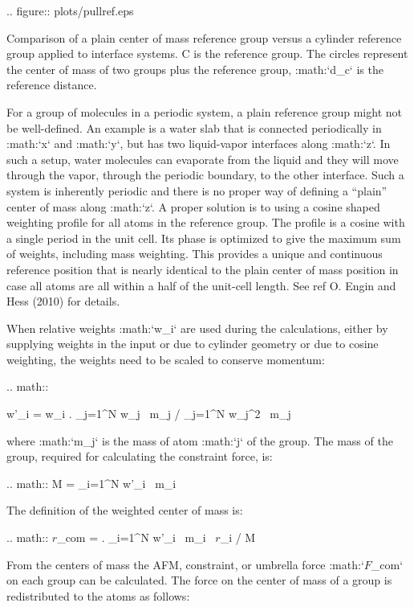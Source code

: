 .. figure:: plots/pullref.eps

   Comparison of a plain center of mass reference group versus a
   cylinder reference group applied to interface systems. C is the
   reference group. The circles represent the center of mass of two
   groups plus the reference group, :math:`d_c` is the reference
   distance.

For a group of molecules in a periodic system, a plain reference group
might not be well-defined. An example is a water slab that is connected
periodically in :math:`x` and :math:`y`, but has two liquid-vapor
interfaces along :math:`z`. In such a setup, water molecules can
evaporate from the liquid and they will move through the vapor, through
the periodic boundary, to the other interface. Such a system is
inherently periodic and there is no proper way of defining a “plain”
center of mass along :math:`z`. A proper solution is to using a cosine
shaped weighting profile for all atoms in the reference group. The
profile is a cosine with a single period in the unit cell. Its phase is
optimized to give the maximum sum of weights, including mass weighting.
This provides a unique and continuous reference position that is nearly
identical to the plain center of mass position in case all atoms are all
within a half of the unit-cell length. See ref O. Engin and Hess (2010)
for details.

When relative weights :math:`w_i` are used during the calculations,
either by supplying weights in the input or due to cylinder geometry or
due to cosine weighting, the weights need to be scaled to conserve
momentum:

.. math::

   w'_i = w_i
   \left. \sum_{j=1}^N w_j \, m_j \right/ \sum_{j=1}^N w_j^2 \, m_j

where :math:`m_j` is the mass of atom :math:`j` of the group. The mass
of the group, required for calculating the constraint force, is:

.. math:: M = \sum_{i=1}^N w'_i \, m_i

The definition of the weighted center of mass is:

.. math:: {\mbox{\boldmath ${r}$}}_{com} = \left. \sum_{i=1}^N w'_i \, m_i \, {\mbox{\boldmath ${r}$}}_i \right/ M

From the centers of mass the AFM, constraint, or umbrella force
:math:`{\mbox{\boldmath ${F}$}}_{\!com}` on each group can be
calculated. The force on the center of mass of a group is redistributed
to the atoms as follows:

